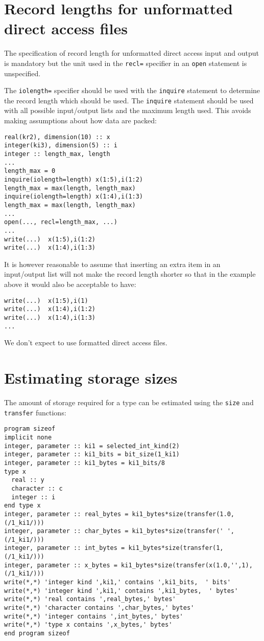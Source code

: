 \documentclass[11pt,twoside,a4paper]{report}
\begin{document}
\section{Record lengths for unformatted direct access files}

The specification of record length for unformatted direct access input 
and output is mandatory but the unit used in the \verb|recl=|
specifier in an \verb|open| statement is unspecified.

The \verb|iolength=| specifier should be used with the \verb|inquire|
statement to determine the record length which should be used.
The \verb|inquire| statement should be used with all possible
input/output lists and the maximum length used. This avoids
making assumptions about how data are packed:
\begin{verbatim}
real(kr2), dimension(10) :: x
integer(ki3), dimension(5) :: i
integer :: length_max, length
...
length_max = 0
inquire(iolength=length) x(1:5),i(1:2)
length_max = max(length, length_max)
inquire(iolength=length) x(1:4),i(1:3)
length_max = max(length, length_max)
...
open(..., recl=length_max, ...)
...
write(...)  x(1:5),i(1:2)
write(...)  x(1:4),i(1:3)
\end{verbatim}
It is however reasonable to assume that inserting an extra item in an
input/output list will not make the record length shorter so that in
the example above it would also be acceptable to have:
\begin{verbatim}
write(...)  x(1:5),i(1)
write(...)  x(1:4),i(1:2)
write(...)  x(1:4),i(1:3)
...
\end{verbatim}

We don't expect to use formatted direct access files.

\section{Estimating storage sizes}
\label{sec:sizeof}

The amount of storage required for a type can be estimated using
the \verb|size| and \verb|transfer| functions:

\begin{verbatim}
program sizeof
implicit none
integer, parameter :: ki1 = selected_int_kind(2)
integer, parameter :: ki1_bits = bit_size(1_ki1)
integer, parameter :: ki1_bytes = ki1_bits/8
type x 
  real :: y
  character :: c
  integer :: i
end type x
integer, parameter :: real_bytes = ki1_bytes*size(transfer(1.0,(/1_ki1/)))
integer, parameter :: char_bytes = ki1_bytes*size(transfer(' ',(/1_ki1/)))
integer, parameter :: int_bytes = ki1_bytes*size(transfer(1,(/1_ki1/)))
integer, parameter :: x_bytes = ki1_bytes*size(transfer(x(1.0,'',1),(/1_ki1/)))
write(*,*) 'integer kind ',ki1,' contains ',ki1_bits,  ' bits'
write(*,*) 'integer kind ',ki1,' contains ',ki1_bytes,  ' bytes'
write(*,*) 'real contains ',real_bytes,' bytes'
write(*,*) 'character contains ',char_bytes,' bytes'
write(*,*) 'integer contains ',int_bytes,' bytes'
write(*,*) 'type x contains ',x_bytes,' bytes'
end program sizeof
\end{verbatim}
\end{document}
